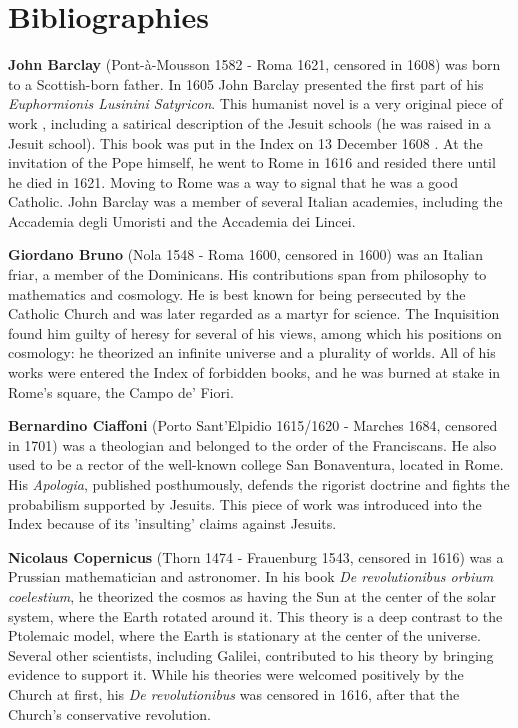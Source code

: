 
\FloatBarrier
\section{Bibliographies}\label{appendix:b}

\textbf{John Barclay}  (Pont-à-Mousson 1582 - Roma 1621, censored in 1608) was born to a Scottish-born father. In 1605 John Barclay presented the first part of his {\em Euphormionis Lusinini Satyricon}. This humanist novel is a very original piece of work \cite{correard17}, including a  satirical description of the Jesuit schools (he was raised in a Jesuit school). This book was put in the Index on 13 December 1608 \cite{de2002index}. At the invitation of the Pope himself, he went to Rome in 1616 and resided there until he died in 1621. Moving to Rome was a way to signal that he was a good Catholic. John Barclay was a member of several Italian academies, including the Accademia degli Umoristi and the Accademia dei Lincei.


\textbf{Giordano Bruno}  (Nola 1548 - Roma 1600, censored in 1600) was an Italian friar, a member of the Dominicans. His contributions span from philosophy to mathematics and cosmology. He is best known for being persecuted by the Catholic Church and was later regarded as a martyr for science. The Inquisition found him guilty of heresy for several of his views, among which his positions on cosmology: he theorized an infinite universe and a plurality of worlds. All of his works were entered the Index of forbidden books, and he was burned at stake in Rome's square, the Campo de' Fiori.

\textbf{Bernardino Ciaffoni} (Porto Sant'Elpidio 1615/1620 - Marches 1684, censored in 1701) was a theologian and belonged to the order of the Franciscans. He also used to be a rector of the well-known college San Bonaventura, located in Rome. His \textit{Apologia}, published posthumously, defends the rigorist doctrine and fights the probabilism supported by Jesuits. This piece of work was introduced into the Index because of its 'insulting' claims against Jesuits.


\textbf{Nicolaus Copernicus} (Thorn 1474 - Frauenburg 1543, censored in 1616) was a Prussian mathematician and astronomer. In his book \textit{De revolutionibus orbium coelestium}, he theorized the cosmos as having the Sun at the center of the solar system, where the Earth rotated around it. This theory is a deep contrast to the Ptolemaic model, where the Earth is stationary at the center of the universe. Several other scientists, including Galilei, contributed to his theory by bringing evidence to support it. While his theories were welcomed positively by the Church at first, his \textit{De revolutionibus} was censored in 1616, after that the Church's conservative revolution.

